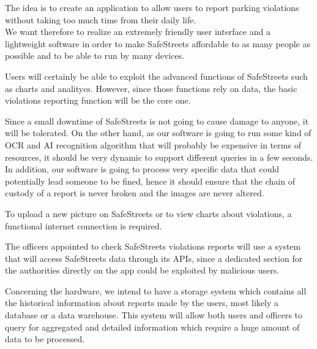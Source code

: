 \setlength{\parskip}{1em}
The idea is to create an application to allow users to report parking violations without taking too much time from their daily life.
\\We want therefore to realize an extremely friendly user interface and a lightweight software in order to make SafeStreets affordable to as many people as possible and to be able to run by many devices.

Users will certainly be able to exploit the advanced functions of SafeStreets such as charts and analitycs. However, since those functions rely on data, the basic violations reporting function will be the core one.

Since a small downtime of SafeStreets is not going to cause damage to anyone, it will be tolerated. On the other hand, as our software is going to run some kind of OCR and AI recognition algorithm that will probably be expensive in terms of resources, it should be very dynamic to support different queries in a few seconds.
\\In addition, our software is going to process very specific data that could potentially lead someone to be fined, hence it should ensure that the chain of custody of a report is never broken and the images are never altered.

To upload a new picture on SafeStreets or to view charts about violations, a functional internet connection is required.

The officers appointed to check SafeStreets violations reports will use a system that will access SafeStreets data through its APIs, since a dedicated section for the authorities directly on the app could be exploited by malicious users.

Concerning the hardware, we intend to have a storage system which contains all the historical information about reports made by the users, most likely a database or a data warehouse. This system will allow both users and officers to query for aggregated and detailed information which require a huge amount of data to be processed.
\clearpage